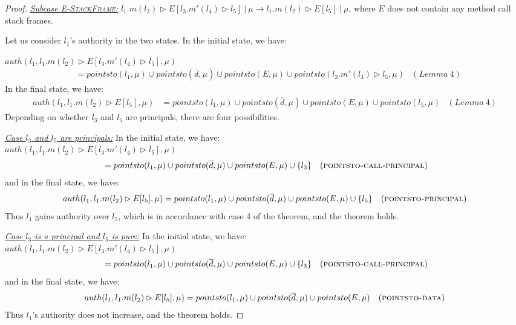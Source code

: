 \documentclass{llncs}
\begin{document}
\begin{proof}
\noindent\underline{\textit{Subcase \textsc{E-StackFrame}:}}
$l_1.m(l_2) \rhd E[l_3.m'(l_4) \rhd l_5]~|~\mu \longrightarrow l_1.m(l_2) \rhd E[l_5]~|~\mu$, where $E$ does not contain any method call stack frames.

\noindent Let us consider $l_1$'s authority in the two states. In the initial state, we have:

\noindent$auth(l_1, l_1.m(l_2) \rhd E[l_3.m'(l_4) \rhd l_5], \mu)$
\vspace{-7pt}
\begin{align*}
&= pointsto(l_1, \mu) \cup pointsto(\overline{d}, \mu) \cup pointsto(E, \mu) \cup pointsto(l_3.m'(l_4) \rhd l_5, \mu) & (Lemma~4)
\end{align*}
In the final state, we have:
\begin{align*}
auth(l_1, l_1.m(l_2) \rhd E[l_5], \mu) &= pointsto(l_1, \mu) \cup pointsto(\overline{d}, \mu) \cup pointsto(E, \mu) \cup pointsto(l_5, \mu) & (Lemma~4)
\end{align*}
Depending on whether $l_3$ and $l_5$ are principals, there are four possibilities.

\noindent\underline{\textit{Case $l_3$ and $l_5$ are principals:}}
In the initial state, we have:\\
\noindent$auth(l_1, l_1.m(l_2) \rhd E[l_3.m'(l_4) \rhd l_5], \mu)$
\vspace{-7pt}
\begin{align*}
&= pointsto(l_1, \mu) \cup pointsto(\overline{d}, \mu) \cup pointsto(E, \mu) \cup \{ l_3 \} & (\textsc{pointsto-call-principal})
\end{align*}
and in the final state, we have:
\begin{align*}
auth(l_1, l_1.m(l_2) \rhd E[l_5], \mu) &= pointsto(l_1, \mu) \cup pointsto(\overline{d}, \mu) \cup pointsto(E, \mu) \cup \{ l_5 \} & (\textsc{pointsto-principal})
\end{align*}
Thus $l_1$ gains authority over $l_5$, which is in accordance with case 4 of the theorem, and the theorem holds.

\noindent\underline{\textit{Case $l_3$ is a principal and $l_5$ is pure:}}
In the initial state, we have:\\
\noindent$auth(l_1, l_1.m(l_2) \rhd E[l_3.m'(l_4) \rhd l_5], \mu)$
\vspace{-7pt}
\begin{align*}
&= pointsto(l_1, \mu) \cup pointsto(\overline{d}, \mu) \cup pointsto(E, \mu) \cup \{ l_3 \} & (\textsc{pointsto-call-principal})
\end{align*}
and in the final state, we have:
\begin{align*}
auth(l_1, l_1.m(l_2) \rhd E[l_5], \mu) &= pointsto(l_1, \mu) \cup pointsto(\overline{d}, \mu) \cup pointsto(E, \mu) & (\textsc{pointsto-data})
\end{align*}
Thus $l_1$'s authority does not increase, and the theorem holds.


\end{proof}
\end{document}
